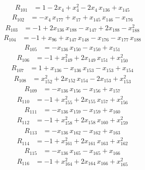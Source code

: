 \begin{align*}
R_{101} &= 1 -2x_{4} +x_{4}^{2} -2x_{4}\,x_{136} +x_{145}
\end{align*}
\begin{align*}
R_{102} &= -x_{4}\,x_{177} +x_{17} +x_{145}\,x_{146} -x_{176}
\end{align*}
\begin{align*}
R_{103} &= -1 +2x_{136}\,x_{188} -x_{147} +2x_{188} -x_{188}^{2}
\end{align*}
\begin{align*}
R_{104} &= -1 +x_{96} +x_{147}\,x_{148} -x_{176} -x_{177}\,x_{188}
\end{align*}
\begin{align*}
R_{105} &= -x_{136}\,x_{150} -x_{150} +x_{151}
\end{align*}
\begin{align*}
R_{106} &= -1 +x_{149}^{2} +2x_{149}\,x_{151} +x_{150}^{2}
\end{align*}
\begin{align*}
R_{107} &= 1 +x_{136} -x_{136}\,x_{153} -x_{153} +x_{154}
\end{align*}
\begin{align*}
R_{108} &= x_{152}^{2} +2x_{152}\,x_{154} -2x_{153} +x_{153}^{2}
\end{align*}
\begin{align*}
R_{109} &= -x_{136}\,x_{156} -x_{156} +x_{157}
\end{align*}
\begin{align*}
R_{110} &= -1 +x_{155}^{2} +2x_{155}\,x_{157} +x_{156}^{2}
\end{align*}
\begin{align*}
R_{111} &= -x_{136}\,x_{159} -x_{159} +x_{160}
\end{align*}
\begin{align*}
R_{112} &= -1 +x_{158}^{2} +2x_{158}\,x_{160} +x_{159}^{2}
\end{align*}
\begin{align*}
R_{113} &= -x_{136}\,x_{162} -x_{162} +x_{163}
\end{align*}
\begin{align*}
R_{114} &= -1 +x_{161}^{2} +2x_{161}\,x_{163} +x_{162}^{2}
\end{align*}
\begin{align*}
R_{115} &= -x_{136}\,x_{165} -x_{165} +x_{166}
\end{align*}
\begin{align*}
R_{116} &= -1 +x_{164}^{2} +2x_{164}\,x_{166} +x_{165}^{2}
\end{align*}
